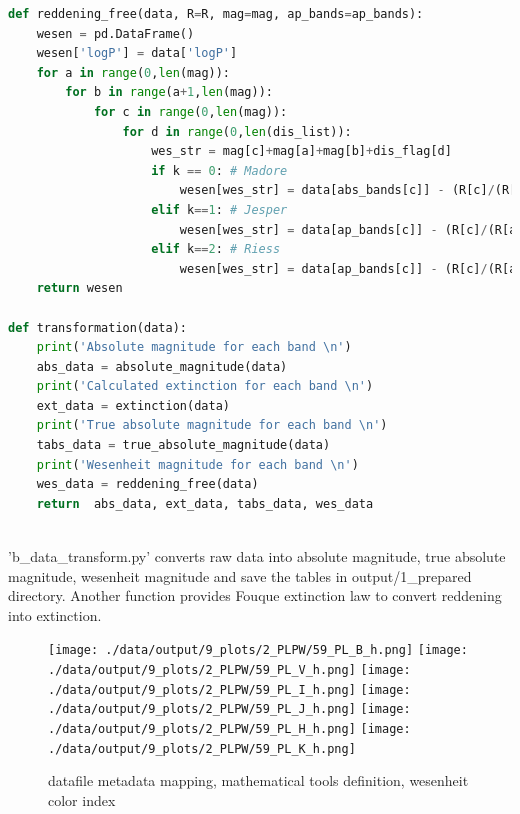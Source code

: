 \documentclass{article}
\begin{document}
\begin{lstlisting}[language=Python, caption=edit this function as per input dataset]
def reddening_free(data, R=R, mag=mag, ap_bands=ap_bands):
    wesen = pd.DataFrame()
    wesen['logP'] = data['logP']
    for a in range(0,len(mag)):
        for b in range(a+1,len(mag)):
            for c in range(0,len(mag)):
                for d in range(0,len(dis_list)):
                    wes_str = mag[c]+mag[a]+mag[b]+dis_flag[d]
                    if k == 0: # Madore
                        wesen[wes_str] = data[abs_bands[c]] - (R[c]/(R[a]-R[b]))*(data[abs_bands[a]] - data[abs_bands[b]])
                    elif k==1: # Jesper
                        wesen[wes_str] = data[ap_bands[c]] - (R[c]/(R[a]-R[b]))*(data[ap_bands[a]] - data[ap_bands[b]]) - data[dis_list[d]]
                    elif k==2: # Riess
                        wesen[wes_str] = data[ap_bands[c]] - (R[c]/(R[a]-R[b]))*(data[ap_bands[a]] - data[ap_bands[b]]) - data[dis_list[d]]
    return wesen

def transformation(data):
    print('Absolute magnitude for each band \n')
    abs_data = absolute_magnitude(data)    
    print('Calculated extinction for each band \n')
    ext_data = extinction(data)
    print('True absolute magnitude for each band \n')
    tabs_data = true_absolute_magnitude(data)
    print('Wesenheit magnitude for each band \n')
    wes_data = reddening_free(data)
    return  abs_data, ext_data, tabs_data, wes_data
        
\end{lstlisting}



'b\_data\_transform.py' converts raw data into absolute magnitude, true absolute magnitude, wesenheit magnitude and save the tables in output/1\_prepared directory. Another function provides Fouque extinction law to convert reddening into extinction. 

\newpage
\begin{figure}[h!]
\caption{\small datafile metadata mapping, mathematical tools definition, wesenheit color index}
\texttt{[image: ./data/output/9\_plots/2\_PLPW/59\_PL\_B\_h.png]}
\texttt{[image: ./data/output/9\_plots/2\_PLPW/59\_PL\_V\_h.png]}
\texttt{[image: ./data/output/9\_plots/2\_PLPW/59\_PL\_I\_h.png]}
\texttt{[image: ./data/output/9\_plots/2\_PLPW/59\_PL\_J\_h.png]}
\texttt{[image: ./data/output/9\_plots/2\_PLPW/59\_PL\_H\_h.png]}
\texttt{[image: ./data/output/9\_plots/2\_PLPW/59\_PL\_K\_h.png]}
\end{figure}
\end{document}
